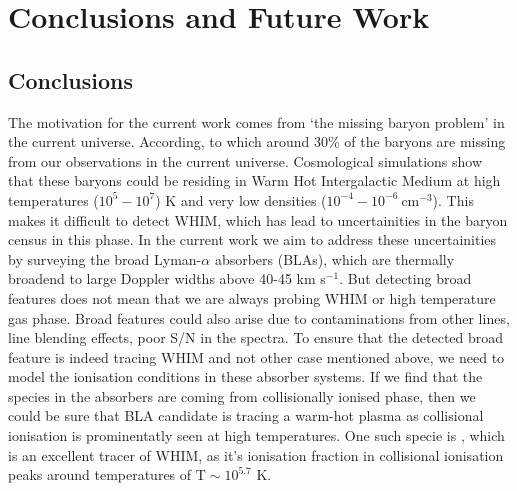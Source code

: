 \chapter{Conclusions and Future Work} \label{ch:conclusions}

\section{Conclusions}

The motivation for the current work comes from `the missing baryon problem' in the current universe. According, to which around 30\% of the baryons are missing from our observations in the current universe. Cosmological simulations show that these baryons could be residing in Warm Hot Intergalactic Medium at high temperatures ($10^5-10^7$) K and very low densities ($10^{-4} - 10^{-6} \ \text{cm}^{-3}$). This makes it difficult to detect WHIM, which has lead to uncertainities in the baryon census in this phase. In the current work we aim to address these uncertainities by surveying the broad Lyman-$\alpha$ absorbers (BLAs), which are thermally broadend to large Doppler widths above 40-45 km s$^{-1}$. But detecting broad features does not mean that we are always probing WHIM or high temperature gas phase. Broad features could also arise due to contaminations from other lines, line blending effects, poor S/N in the spectra. To ensure that the detected broad feature is indeed tracing WHIM and not other case mentioned above, we need to model the ionisation conditions in these absorber systems. If we find that the species in the absorbers are coming from collisionally ionised phase, then we could be sure that BLA candidate is tracing a warm-hot plasma as collisional ionisation is prominentatly seen at high temperatures. One such specie is , which is an excellent tracer of WHIM, as it's ionisation fraction in collisional ionisation peaks around temperatures of $\text{T} \sim 10^{5.7}$ K.   

